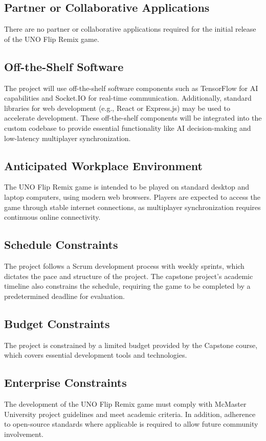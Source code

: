 \documentclass{article}
\begin{document}
\subsection{Partner or Collaborative Applications}
There are no partner or collaborative applications required for the initial release of the UNO Flip Remix game.

\subsection{Off-the-Shelf Software}
The project will use off-the-shelf software components such as TensorFlow for AI capabilities and Socket.IO for real-time communication. Additionally, standard libraries for web development (e.g., React or Express.js) may be used to accelerate development. These off-the-shelf components will be integrated into the custom codebase to provide essential functionality like AI decision-making and low-latency multiplayer synchronization.

\subsection{Anticipated Workplace Environment}
The UNO Flip Remix game is intended to be played on standard desktop and laptop computers, using modern web browsers. Players are expected to access the game through stable internet connections, as multiplayer synchronization requires continuous online connectivity.

\subsection{Schedule Constraints}
The project follows a Scrum development process with weekly sprints, which dictates the pace and structure of the project. The capstone project's academic timeline also constrains the schedule, requiring the game to be completed by a predetermined deadline for evaluation.

\subsection{Budget Constraints}
The project is constrained by a limited budget provided by the Capstone course, which covers essential development tools and technologies.

\subsection{Enterprise Constraints}
The development of the UNO Flip Remix game must comply with McMaster University project guidelines and meet academic criteria. In addition, adherence to open-source standards where applicable is required to allow future community involvement.
\end{document}
